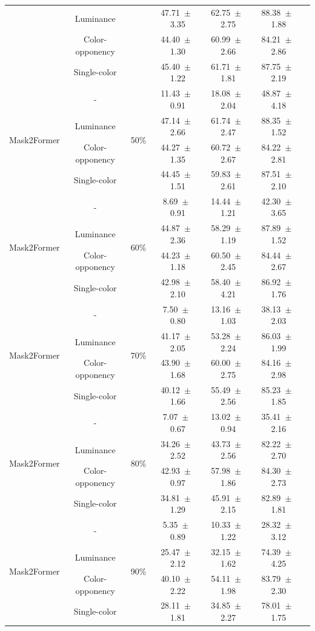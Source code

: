 \begin{table}[h]
\begin{tabular}{@{}lccc ccc@{}}
& Luminance & & 47.71~$\pm$~3.35 & 62.75~$\pm$~2.75 & 88.38~$\pm$~1.88 \\
& Color-opponency & & 44.40~$\pm$~1.30 & 60.99~$\pm$~2.66 & 84.21~$\pm$~2.86 \\
& Single-color & & 45.40~$\pm$~1.22 & 61.71~$\pm$~1.81 & 87.75~$\pm$~2.19 \\
\midrule
\multirow{4}{*}{Mask2Former} & - & \multirow{4}{*}{50\%} & 11.43~$\pm$~0.91 & 18.08~$\pm$~2.04 & 48.87~$\pm$~4.18 \\
& Luminance & & 47.14~$\pm$~2.66 & 61.74~$\pm$~2.47 & 88.35~$\pm$~1.52 \\
& Color-opponency & & 44.27~$\pm$~1.35 & 60.72~$\pm$~2.67 & 84.22~$\pm$~2.81 \\
& Single-color & & 44.45~$\pm$~1.51 & 59.83~$\pm$~2.61 & 87.51~$\pm$~2.10 \\
\midrule
\multirow{4}{*}{Mask2Former} & - & \multirow{4}{*}{60\%} & 8.69~$\pm$~0.91 & 14.44~$\pm$~1.21 & 42.30~$\pm$~3.65 \\
& Luminance & & 44.87~$\pm$~2.36 & 58.29~$\pm$~1.19 & 87.89~$\pm$~1.52 \\
& Color-opponency & & 44.23~$\pm$~1.18 & 60.50~$\pm$~2.45 & 84.44~$\pm$~2.67 \\
& Single-color & & 42.98~$\pm$~2.10 & 58.40~$\pm$~4.21 & 86.92~$\pm$~1.76 \\
\midrule
\multirow{4}{*}{Mask2Former} & - & \multirow{4}{*}{70\%} & 7.50~$\pm$~0.80 & 13.16~$\pm$~1.03 & 38.13~$\pm$~2.03 \\
& Luminance & & 41.17~$\pm$~2.05 & 53.28~$\pm$~2.24 & 86.03~$\pm$~1.99 \\
& Color-opponency & & 43.90~$\pm$~1.68 & 60.00~$\pm$~2.75 & 84.16~$\pm$~2.98 \\
& Single-color & & 40.12~$\pm$~1.66 & 55.49~$\pm$~2.56 & 85.23~$\pm$~1.85 \\
\midrule
\multirow{4}{*}{Mask2Former} & - & \multirow{4}{*}{80\%} & 7.07~$\pm$~0.67 & 13.02~$\pm$~0.94 & 35.41~$\pm$~2.16 \\
& Luminance & & 34.26~$\pm$~2.52 & 43.73~$\pm$~2.56 & 82.22~$\pm$~2.70 \\
& Color-opponency & & 42.93~$\pm$~0.97 & 57.98~$\pm$~1.86 & 84.30~$\pm$~2.73 \\
& Single-color & & 34.81~$\pm$~1.29 & 45.91~$\pm$~2.15 & 82.89~$\pm$~1.81 \\
\midrule
\multirow{4}{*}{Mask2Former} & - & \multirow{4}{*}{90\%} & 5.35~$\pm$~0.89 & 10.33~$\pm$~1.22 & 28.32~$\pm$~3.12 \\
& Luminance & & 25.47~$\pm$~2.12 & 32.15~$\pm$~1.62 & 74.39~$\pm$~4.25 \\
& Color-opponency & & 40.10~$\pm$~2.22 & 54.11~$\pm$~1.98 & 83.79~$\pm$~2.30 \\
& Single-color & & 28.11~$\pm$~1.81 & 34.85~$\pm$~2.27 & 78.01~$\pm$~1.75 \\
\midrule
\bottomrule
\end{tabular}
\label{tab:sparse_results_mask2former_acdc_rain}
\end{table}